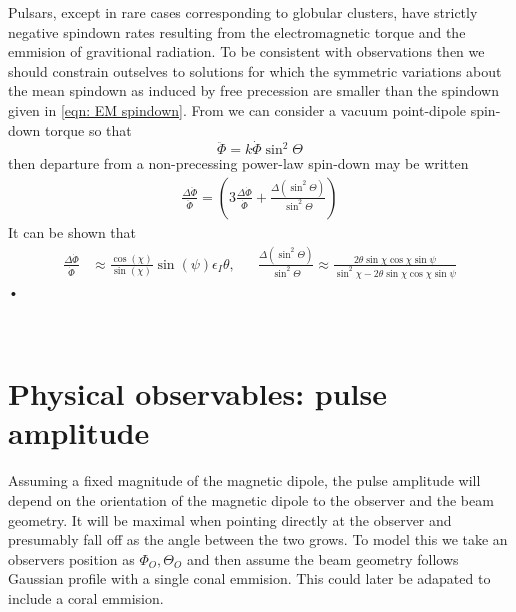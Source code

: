 \documentclass[../full_thesis/full_thesis.tex]{subfiles}
\begin{document}
Pulsars, except in rare cases corresponding to globular clusters, have strictly 
negative spindown rates resulting from the electromagnetic torque and 
the emmision of gravitional radiation. To be consistent with observations then
we should constrain outselves to solutions for which the symmetric variations
about the mean spindown as induced by free precession are smaller than the 
spindown given in \eqref{eqn: EM spindown}. From \citet{Jones2001} we can
consider a vacuum point-dipole spin-down torque so that
\begin{equation}
\ddot{\Phi} = k \dot{\Phi} \sin^{2}\Theta
\end{equation}
then departure from a non-precessing power-law spin-down may be written
\begin{align}
\frac{\Delta\ddot{\Phi}}{\ddot{\Phi}} = \left(3 \frac{\Delta\dot{\Phi}}{\dot{\Phi}} + \frac{\Delta(\sin^{2}\Theta)}{\sin^{2}\Theta}\right)
\end{align}
It can be shown that 
\begin{align}
\frac{\Delta\dot{\Phi}}{\dot{\Phi}} & \approx \frac{\cos(\chi)}{\sin(\chi)}\sin(\psi) \epsilon_{I}\theta, &&
\frac{\Delta(\sin^{2}\Theta)}{\sin^{2}\Theta} \approx \frac{2\theta\sin\chi\cos\chi\sin\psi}{\sin^{2}\chi - 2\theta\sin\chi\cos\chi\sin\psi}
\end{align}•

\begin{figure}[ht]
\centering
	 \\
\caption{}
\label{fig: nu_dot with torque}
\end{figure}


\section{Physical observables: pulse amplitude}
Assuming a fixed magnitude of the magnetic dipole, the pulse amplitude will
depend on the orientation of the magnetic dipole to the observer and the
beam geometry. It will be
maximal when pointing directly at the observer and presumably fall off as the
angle between the two grows. To model this we take an observers position as
$\Phi_{O}, \Theta_{O}$ and then assume the beam geometry follows
Gaussian profile with a single conal emmision. This could later be adapated
to include a coral emmision.
\end{document}
